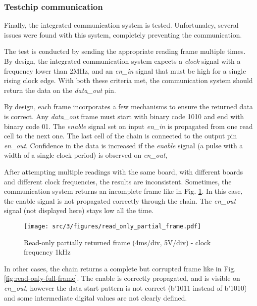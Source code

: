 \subsubsection{Testchip communication}

Finally, the integrated communication system is tested.
Unfortunaley, several issues were found with this system, completely preventing the communication.

The test is conducted by sending the appropriate reading frame multiple times.
By design, the integrated communication system expects a \textit{clock} signal with a frequency lower than 2MHz, and an \textit{en\_in} signal that must be high for a single rising clock edge.
With both these criteria met, the communication system should return the data on the \textit{data\_out} pin.

By design, each frame incorporates a few mechanisms to ensure the returned data is correct.
Any \textit{data\_out} frame must start with binary code 1010 and end with binary code 01.
The \textit{enable} signal set on input \textit{en\_in} is propagated from one read cell to the next one.
The last cell of the chain is connected to the output pin \textit{en\_out}.
Confidence in the data is increased if the \textit{enable} signal (a pulse with a width of a single clock period) is observed on \textit{en\_out},

After attempting multiple readings with the same board, with different boards and different clock frequencies, the results are inconsistent.
Sometimes, the communication system returns an incomplete frame like in Fig. \ref{fig:read-only-partial-frame}.
In this case, the enable signal is not propagated correctly through the chain.
The \textit{en\_out} signal (not displayed here) stays low all the time.

\begin{figure}[!h]
  \centering
  \texttt{[image: src/3/figures/read\_only\_partial\_frame.pdf]}
  \caption{Read-only partially returned frame (4ms/div, 5V/div) - clock frequency 1kHz}
  \label{fig:read-only-partial-frame}
\end{figure}

In other cases, the chain returns a complete but corrupted frame like in Fig. \ref{fig:read-only-full-frame}.
The enable is correctly propagated, and is visible on \textit{en\_out}, however the data start pattern is not correct (b'1011 instead of b'1010) and some intermediate digital values are not clearly defined.

